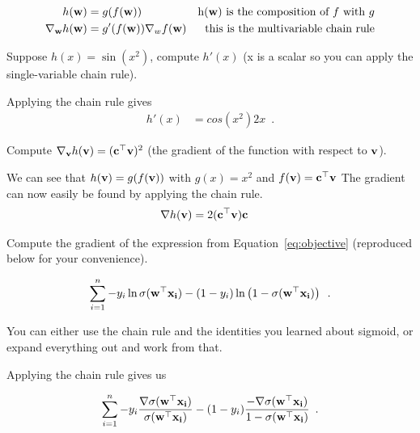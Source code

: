 \documentclass[assignment03_Solutions]{subfiles}
\begin{document}
\begin{align}
h(\mathbf{w}) &= g(f(\mathbf{w}))&\mbox{h($\mathbf{w}$) is the composition of $f$ with $g$} \nonumber \\
\nabla_{\mathbf{w}} h(\mathbf{w}) &= g'(f(\mathbf{w})) \nabla_w f(\mathbf{w}) & \mbox{this is the multivariable chain rule}
\end{align}

\begin{exercise}[(60 minutes)]
\bes
\item Suppose $h(x) = \sin(x^2)$, compute $h'(x)$ (x is a scalar so you can apply the single-variable chain rule).

\begin{boxedsolution}

Applying the chain rule gives
\begin{align}
h'(x) &= cos(x^2) 2x \enspace .
\end{align}
\end{boxedsolution}

\item Compute $\nabla_{\mathbf{v}} h(\mathbf{v}) = (\mathbf{c}^\top \mathbf{v})^2$ (the gradient of the function with respect to $\mathbf{v}$).

\begin{boxedsolution}
We can see that $h(\mathbf{v}) = g(f(\mathbf{v}))$ with $g(x) = x^2$ and $f(\mathbf{v}) = \mathbf{c}^\top \mathbf{v}$ The gradient can now easily be found by applying the chain rule.
\begin{align}
\nabla h(\mathbf{v}) &= 2(\mathbf{c}^\top \mathbf{v}) \mathbf{c}
\end{align}
\end{boxedsolution}

\item Compute the gradient of the expression from Equation~\ref{eq:objective} (reproduced below for your convenience).

\begin{align}
 \sum_{i=1}^n -y_i \ln \sigma( \mathbf{w}^\top \mathbf{x_i}) - (1-y_i) \ln  \left (1 - \sigma( \mathbf{w}^\top \mathbf{x_i}) \right ) \enspace .
\end{align}

You can either use the chain rule and the identities you learned about sigmoid, or expand everything out and work from that.

\begin{boxedsolution}
Applying the chain rule gives us

\begin{align}
 \sum_{i=1}^n -y_i \frac{\nabla \sigma( \mathbf{w}^\top \mathbf{x_i})}{\sigma( \mathbf{w}^\top \mathbf{x_i})} - (1-y_i) \frac{- \nabla \sigma( \mathbf{w}^\top \mathbf{x_i})}{1 - \sigma( \mathbf{w}^\top \mathbf{x_i})}  \enspace .
\end{align}


\end{boxedsolution}
\end{exercise}
\end{document}
